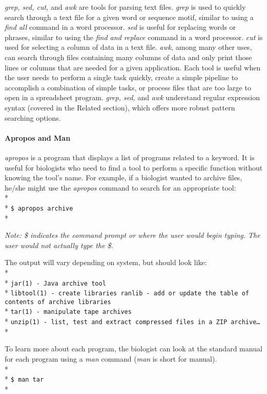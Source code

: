 \documentclass[ChapterTOCs,krantz2]{krantz} %
\begin{document}
\emph{grep, sed, cut,} and \emph{awk} are tools for parsing text files.
\emph{grep} is used to
quickly search through a text file for a given word or sequence
motif, similar to using a \emph{find all} command in a word processor.  \emph{sed} is
useful for replacing words or phrases,
similar to using the \emph{find and replace} command in a word processor.
\emph{cut} is
used for selecting a column of data in a text file.  \emph{awk}, among many other uses, 
can search through files containing many columns of data and only print
those lines or columns that are needed for a given application.  
Each tool is useful when the user needs to
perform a single task quickly, create a simple pipeline to accomplish a
combination of simple tasks, or process files that are too large to open in a
spreadsheet program.  \emph{grep, sed,} and \emph{awk} understand regular expression
syntax (covered in the Related section), which offers more robust pattern searching options.  

\paragraph{Apropos and Man}

\emph{apropos}
is a program that
displays a list of programs related to a keyword. It is
useful for biologists who need to find a tool to perform a specific function without 
knowing the tool's name. For example, if a biologist wanted to archive files,
he/she might use the \emph{apropos} command to search for an appropriate tool:\\* \\*
\texttt{\$ apropos archive}\\*

\noindent
\textsl{Note: \$ indicates the command prompt or where the user would begin typing.
The user would not actually type the \$.}

The output will vary depending on system, but should look like:\\* \\*
\texttt{jar(1)    - Java archive tool}\\*
\texttt{libtool(1)    - create libraries ranlib - add or update the table of
contents of archive libraries}\\*
\texttt{tar(1)    - manipulate tape archives}\\*
\texttt{unzip(1)    - list, test and extract compressed files in a
ZIP archive\ldots}\\*

\noindent
To learn more about each program, 
the biologist can look at the standard manual for each program using a
\emph{man} command (\emph{man} is short for manual).\\* \\*
\texttt{\$ man tar}\\*
\end{document}

